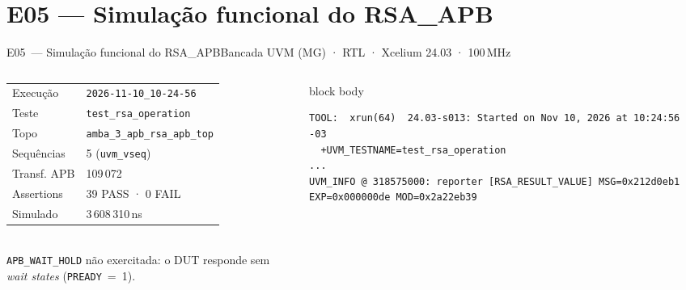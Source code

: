 \documentclass[aspectratio=169,10pt,t]{beamer}
\begin{document}
\section{E05 — Simulação funcional do RSA\_APB}
\begin{frame}[fragile]{E05~— Simulação funcional do RSA\_APB}{Bancada UVM (MG) · RTL · Xcelium 24.03 · 100\,MHz}
  \vspace*{-0.3cm}
  \begin{columns}[T]
    \begin{column}{0.30\textwidth}
      \vspace{0.15cm}
      \scriptsize
      \begin{tabular}{@{}ll@{}}
        \toprule
        Execução & \texttt{2026-11-10\_10-24-56} \\
        Teste & \texttt{test\_rsa\_operation} \\
        Topo & \texttt{amba\_3\_apb\_rsa\_apb\_top} \\
        Sequências & 5 (\texttt{uvm\_vseq}) \\
        Transf. APB & 109\,072 \\
        Assertions & 39 PASS · 0 FAIL \\
        Simulado & 3\,608\,310\,ns \\
        \bottomrule
      \end{tabular}\\[0.1cm]
      {\tiny \texttt{APB\_WAIT\_HOLD} não exercitada: o DUT responde sem \emph{wait states} (\texttt{PREADY}~=~1).}
    \end{column}
    \begin{column}{0.69\textwidth}
      \tiny
      \begin{beamercolorbox}[rounded=true,shadow=false,sep=3pt]{block body}
\vspace*{-0.6\baselineskip}
\fontsize{4.7}{5.5}\selectfont
\begin{verbatim}
TOOL:  xrun(64)  24.03-s013: Started on Nov 10, 2026 at 10:24:56 -03
  +UVM_TESTNAME=test_rsa_operation
...
UVM_INFO @ 318575000: reporter [RSA_RESULT_VALUE] MSG=0x212d0eb1 EXP=0x000000de MOD=0x2a22eb39

\end{verbatim}
\end{beamercolorbox}
\end{column}
\end{columns}
\end{frame}
\end{document}

